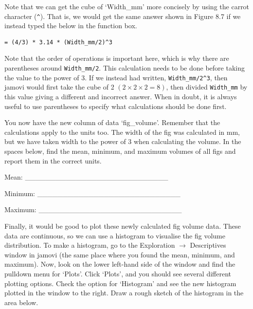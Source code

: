 \documentclass[
  openany]{krantz}
\begin{document}
Note that we can get the cube of `Width\_mm' more concisely by using the carrot character (\texttt{\^{}}).
That is, we would get the same answer shown in Figure 8.7 if we instead typed the below in the function box.

\begin{verbatim}
= (4/3) * 3.14 * (Width_mm/2)^3
\end{verbatim}

Note that the order of operations is important here, which is why there are parentheses around \texttt{Width\_mm/2}. This calculation needs to be done before taking the value to the power of 3.
If we instead had written, \texttt{Width\_mm/2\^{}3}, then jamovi would first take the cube of 2 \((2 \times 2 \times 2 = 8)\), then divided \texttt{Width\_mm} by this value giving a different and incorrect answer.
When in doubt, it is always useful to use parentheses to specify what calculations should be done first.

You now have the new column of data `fig\_volume'.
Remember that the calculations apply to the units too.
The width of the fig was calculated in mm, but we have taken width to the power of 3 when calculating the volume.
In the spaces below, find the mean, minimum, and maximum volumes of all figs and report them in the correct units.

Mean: \_\_\_\_\_\_\_\_\_\_\_\_\_\_\_\_\_\_\_\_\_\_\_\_\_\_\_\_

Minimum: \_\_\_\_\_\_\_\_\_\_\_\_\_\_\_\_\_\_\_\_\_\_\_\_\_\_\_\_

Maximum: \_\_\_\_\_\_\_\_\_\_\_\_\_\_\_\_\_\_\_\_\_\_\_\_\_\_\_\_

Finally, it would be good to plot these newly calculated fig volume data.
These data are continuous, so we can use a histogram to visualise the fig volume distribution.
To make a histogram, go to the Exploration \(\to\) Descriptives window in jamovi (the same place where you found the mean, minimum, and maximum).
Now, look on the lower left-hand side of the window and find the pulldown menu for `Plots'.
Click `Plots', and you should see several different plotting options.
Check the option for `Histogram' and see the new histogram plotted in the window to the right.
Draw a rough sketch of the histogram in the area below.

\begin{verbatim}






\end{verbatim}
\end{document}
